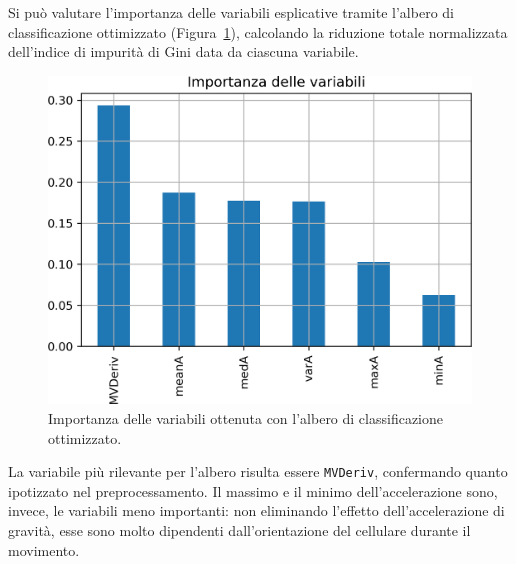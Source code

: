 \documentclass[main.tex]{subfiles}
\begin{document}
Si può valutare l'importanza delle variabili esplicative tramite l'albero di classificazione ottimizzato (Figura~\ref{fig:importance-Tree}), calcolando la riduzione totale normalizzata dell'indice di impurità di Gini data da ciascuna variabile\cite{DecisionTreeClassifier}.
\begin{figure}[H]
	\centering
	\includegraphics[width=0.82\confusion]{../../figure/importance-Tree.png}
	\caption{Importanza delle variabili ottenuta con l'albero di classificazione ottimizzato.}
	\label{fig:importance-Tree}
\end{figure}
La variabile più rilevante per l'albero risulta essere \texttt{MVDeriv}, confermando quanto ipotizzato nel preprocessamento. Il massimo e il minimo dell'accelerazione sono, invece, le variabili meno importanti: non eliminando l'effetto dell'accelerazione di gravità, esse sono molto dipendenti dall'orientazione del cellulare durante il movimento.
\end{document}
